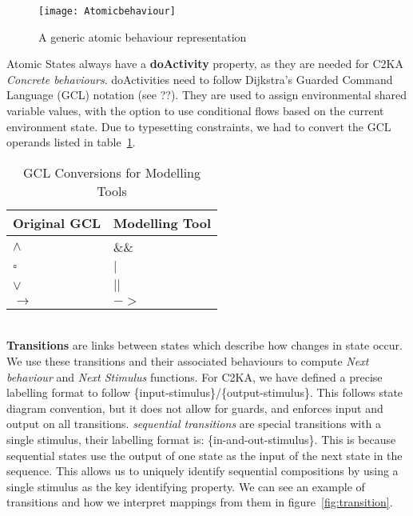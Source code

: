 \begin{figure}[h]
    \centering
    \texttt{[image: Atomicbehaviour]}
    \caption{A generic atomic behaviour representation}
    \label{fig:atomicbehaviour}
\end{figure}

Atomic States always have a \textbf{doActivity} property,
as they are needed for C2KA \textit{Concrete behaviours}.
doActivities need to follow Dijkstra's Guarded Command Language (GCL) notation (see ??). %
They are used to assign environmental shared variable values,
with the option to use conditional flows based on the current environment state.
Due to typesetting constraints, we had to convert the GCL operands listed in table~\ref{tab:gcl-equivalence}.
\begin{table}[htbp]
      \centering
      \caption{GCL Conversions for Modelling Tools}\label{tab:gcl-equivalence}
      \begin{tabular}{| l | l |}
          \hline
          \textbf{Original GCL} & \textbf{Modelling Tool} \\
          \hline
          $\land$ & \&\& \\ \hline
          $\square$ & $|$ \\ \hline
          $\lor$ & $||$ \\ \hline
          $\rightarrow$ & $->$ \\ \hline
      \end{tabular}
\end{table}
\\

\textbf{Transitions} are links between states which describe how changes in state occur.
We use these transitions and their associated behaviours to compute \textit{Next behaviour} and \textit{Next Stimulus} functions.
For C2KA, we have defined a precise labelling format to follow \{input-stimulus\}/\{output-stimulus\}.
This follows state diagram convention, but it does not allow for guards,
and enforces input and output on all transitions.
\textit{sequential transitions} are special transitions with a single stimulus, their labelling format is: \{in-and-out-stimulus\}.
This is because sequential states use the output of one state as the input of the next state in the sequence.
This allows us to uniquely identify sequential compositions by using a single stimulus as the key identifying property.
We can see an example of transitions and how we interpret mappings from them in figure~\ref{fig:transition}.

